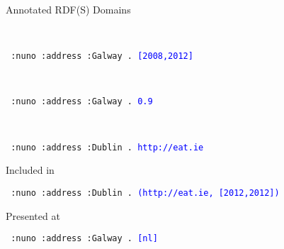 \begin{frame}{Annotated RDF(S) Domains}

  {\color{green}{Temporal:}}\\[-.6em]
  \begin{block}{}
    {\small\tt
      :nuno :address :Galway . \textcolor{blue}{[2008,2012]}
    }
  \end{block}

  {\color{green}{Fuzzy:}}\\[-.6em]
  \begin{block}{}
    {\small\tt
      :nuno :address :Galway . \textcolor{blue}{0.9}
    }
  \end{block}

  {\color{green}{Provenance:}}\\[-.5em]
  \begin{block}{}
    {\small\tt
      :nuno :address :Dublin . \textcolor{blue}{http://eat.ie}
    }
  \end{block}


  \pause
  {\color{green}{Combining domains:}} Included in~\cite{ZimmermannLopesPolleres:2012aa}\\[-.5em]
  \begin{block}{}
    {\small\tt
      :nuno :address :Dublin . \textcolor{blue}{(http://eat.ie, [2012,2012])}
    }
  \end{block}

  \pause
  {\color{green}{Access Control:}} Presented at~\cite{LopesKirraneZimmermann:2012aa}\\[-.5em]
  \begin{block}{}
    {\small\tt
      :nuno :address :Galway . \textcolor{blue}{[nl]}
    }
  \end{block}

  
\end{frame}




